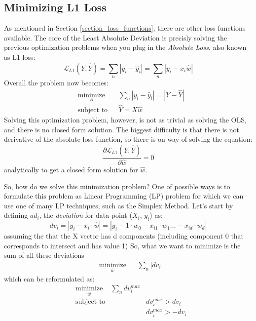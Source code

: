 \subsection{Minimizing L1 Loss}
As mentioned in Section \ref{section_loss_functions}, there are other loss functions available. The core of the Least Absolute Deviation is precisly solving the previous optimization problems when you plug in the \emph{Absolute Loss}, also known as L1 loss: 
\begin{equation}
\mathcal{L}_{L1}(Y, \hat{Y}) = \sum_n | y_i - \hat{y}_i | = \sum_n | y_i - x_i  \hat{w} |
\end{equation}
Overall the problem now becomes:
\begin{equation}
\begin{aligned}
& \underset{R}{\text{minimize}} & &  \sum_n | y_i - \hat{y}_i | = | Y - \hat{Y} |  \\
& \text{subject to} & & \hat{Y} = X \hat{w}  
\label{eq.fundamental_minimization_problem}
\end{aligned}
\end{equation}
Solving this optimization problem, however, is not as trivial as solving the OLS, and there is no closed form solution. The biggest difficulty is that there is not derivative of the absolute loss function, so there is on way of solving the equation:
\begin{equation}
\frac{\partial \mathcal{L}_{L1}(Y, \hat{Y})}{\partial \hat{w}} = 0
\end{equation}
analytically to get a closed form solution for $\hat{w}$.

So, how do we solve this minimization problem? One of possible ways is to formulate this problem as Linear Programming (LP) problem for which we can use one of many LP techniques, such as the Simplex Method. Let's start by defining $ad_i$, the \emph{deviation} for data point ($X_i$, $y_i$) as:
\begin{equation}
dv_i = |y_i - x_i \cdot \hat{w}| = |y_i - 1 \cdot w_0 - x_{i1} \cdot w_1 ... - x_{id} \cdot w_d |
\end{equation}
assuming the that the X vector has d components (including component 0 that corresponds to intersect and has value 1)
So, what we want to minimize is the sum of all these deviations
\begin{equation}
\begin{aligned}
& \underset{\hat{w}}{\text{minimize}} & &  \sum_n | dv_i | 
\label{eq.fundamental_minimization_problem_lad}
\end{aligned}
\end{equation}
which can be reformulated as:
\begin{equation}
\begin{aligned}
& \underset{\hat{w}}{\text{minimize}} &  \sum_n dv^{max}_i  & \\
& \text{subject to}                              & & dv^{max}_i > dv_i \\
&                                                        & & dv^{max}_i > - dv_i \\
\label{eq.fundamental_lad_minimization_problem_simplex}
\end{aligned}
\end{equation}

